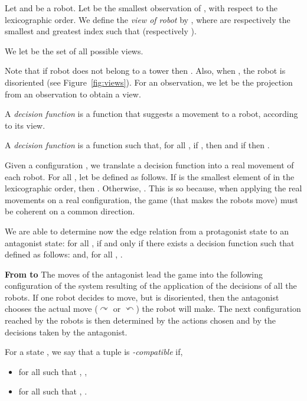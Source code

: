 \documentclass[envcountsame]{llncs} \usepackage[english]{babel}
\newcommand{\clockwise}{\ensuremath{\curvearrowright}}
\newcommand{\counterclockwise}{\ensuremath{\curvearrowleft}}
\begin{document}
\begin{definition}[view]
Let  and  be a robot. Let  be
the smallest observation of , with respect to the lexicographic order. We define the \emph{view of robot } by
, where  are respectively the smallest and greatest index such that  
(respectively ).

We let 
 be the set of all possible views.
\end{definition}

Note that if robot  does not belong to a tower
then . Also, when ,
the robot is disoriented (see Figure~\ref{fig:views}).
For  an observation, we let  be the projection
from an observation to obtain a view.

A \emph{decision function} is a function that suggests a  
movement to a robot, according to its view. 

\begin{definition} A \emph{decision function} is a function  such that, for all , if , then
 and if  then .
\end{definition}

Given a configuration , we translate a decision function  into a real movement of each robot. For all , let  be defined as follows. If  is the smallest element of 
 in the
lexicographic order, then . Otherwise, .
This is so because, when applying the real movements on a real configuration, the game (that makes
the robots move) must be coherent on a common direction.

We are able to determine now the edge relation from a protagonist state to an antagonist
state: for all , 
 { if and only if there exists a decision function  such that } defined as follows:
 and, for all , .
\medskip

\textbf{From  to }
The moves of the antagonist lead the game into the following configuration of the system resulting of the application
of the decisions of all the robots. 
If one robot decides to move, but is disoriented, then the antagonist chooses the actual move (\clockwise{} or 
\counterclockwise) the robot will make. The next configuration reached by the robots is then determined
by the actions chosen and by the decisions taken by the antagonist.

\begin{definition}\label{def:v'-comp}
For a state , we say that a tuple  is \emph{-compatible} if, 
\begin{itemize}
\item for all  such that , ,
\item for all  such that , .
\end{itemize}
\end{definition}
\end{document}
